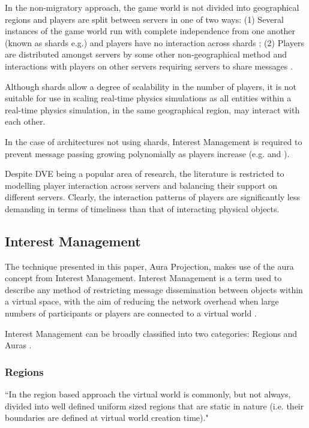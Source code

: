 In the non-migratory approach, the game world is not divided into geographical regions and players are split between servers in one of two ways: (1) Several instances of the game world run with complete independence from one another (known as shards e.g.\cite{WOW}) and players have no interaction across shards \cite{P2PForMMOs}; (2) Players are distributed amongst servers by some other non-geographical method and interactions with players on other servers requiring servers to share messages \cite{LoadBalancingforMMOs}.

Although shards allow a degree of scalability in the number of players, it is not suitable for use in scaling real-time physics simulations as all entities within a real-time physics simulation, in the same geographical region, may interact with each other.

In the case of architectures not using shards, Interest Management is required to prevent message passing growing polynomially as players increase (e.g. \cite{Bezerra2008} and \cite{LoadBalancingforMMOs}).

Despite DVE being a popular area of research, the literature is restricted to modelling player interaction across servers and balancing their support on different servers. Clearly, the interaction patterns of players are significantly less demanding in terms of timeliness than that of interacting physical objects.


\subsection{Interest Management}\label{InterestManagement}
The technique presented in this paper, Aura Projection, makes use of the aura concept from Interest Management. Interest Management is a term used to describe any method of restricting message dissemination between objects within a virtual space, with the aim of reducing the network overhead when large numbers of participants or players are connected to a virtual world \cite{Morgan2005}.

Interest Management can be broadly classified into two categories: Regions and Auras \cite{Morgan2005, storey2004determining}.
\subsubsection{Regions}
``In the region based approach the virtual world is commonly, but not always, divided into well defined uniform sized regions that are static in nature (i.e. their boundaries are defined at virtual world creation time)."\cite{storey2004determining}
